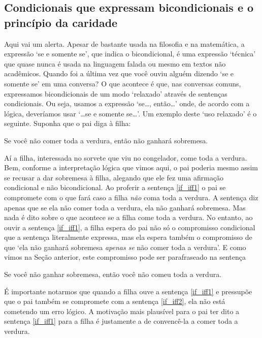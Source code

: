 \subsection{Condicionais que expressam bicondicionais e o princípio da caridade}
Aqui vai um alerta.
Apesar de bastante usada na filosofia e na matemática, a expressão `se e somente se', que indica o bicondicional, é uma expressão `técnica' que quase nunca é usada na linguagem falada ou mesmo em textos não acadêmicos.
Quando foi a última vez que você ouviu alguém dizendo `se e somente se' em uma conversa?
O que acontece é que, nas conversas comuns, expressamos bicondicionais de um modo `relaxado' através de sentenças condicionais.
Ou seja, usamos a expressão `se\ldots, então\ldots' onde, de acordo com a lógica, deveríamos usar  `\ldots{}se e somente se\ldots'.
Um exemplo deste `uso relaxado' é o seguinte.
Suponha que o pai diga à filha:
	\begin{earg}
		\item[\ex{if_iff1}] Se você não comer toda a verdura, então não ganhará sobremesa.
	\end{earg}
Aí a filha, interessada no sorvete que viu no congelador, come toda a verdura.
Bem, conforme a interpretação lógica que vimos aqui, o pai poderia mesmo assim se recusar a dar sobremesa à filha, alegando que ele fez uma afirmação condicional e não bicondicional.
Ao proferir a sentença \ref{if_iff1} o pai se compromete com o que fará caso a filha \emph{não} coma toda a verdura.
A sentença diz apenas que se ela não comer toda a verdura, ela não ganhará sobremesa.
Mas nada é dito sobre o que acontece se a filha come toda a verdura.
No entanto, ao ouvir a sentença \ref{if_iff1}, a filha espera do pai não só o compromisso condicional que a sentença literalmente expressa, mas ela espera também o compromisso de que `ela não ganhará sobremesa \emph{apenas se} não comer toda a verdura'.
E como vimos na Seção anterior, este compromisso pode ser parafraseado na sentença
\begin{earg}
		\item[\ex{if_iff2}] Se você não ganhar sobremesa, então você não comeu toda a verdura.
	\end{earg}
É importante notarmos que quando a filha ouve a sentença \ref{if_iff1} e pressupõe que o pai também se compromete com a sentença \ref{if_iff2}, ela não está cometendo um erro lógico.
A motivação mais plausível para o pai ter dito a sentença \ref{if_iff1} para a filha é justamente a de convencê-la a comer toda a verdura.
